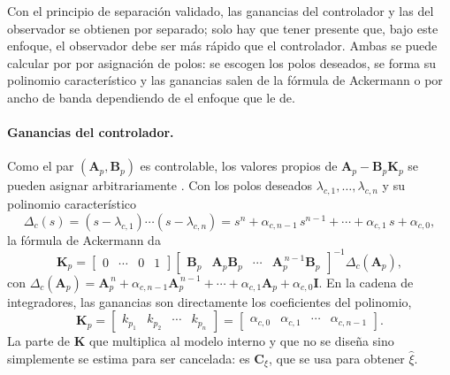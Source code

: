 Con el principio de separación validado, las ganancias del controlador y las del
observador se obtienen por separado; solo hay que tener presente que, bajo este
enfoque, el observador debe ser más rápido que el controlador. Ambas se puede calcular por 
por asignación de polos: se escogen los polos deseados, se forma su polinomio
característico y las ganancias salen de la fórmula de Ackermann o por ancho de banda dependiendo de el enfoque que le de.


\paragraph{Ganancias del controlador.} Como el par $(\mathbf{A}_p, \mathbf{B}_p)$
es controlable, los valores propios de $\mathbf{A}_p - \mathbf{B}_p\mathbf{K}_p$
se pueden asignar arbitrariamente \cite[teo.~8.3]{chen1999linear}. Con los polos
deseados $\lambda_{c,1}, \dots, \lambda_{c,n}$ y su polinomio característico
\begin{equation}
\Delta_c(s) = (s - \lambda_{c,1}) \cdots (s - \lambda_{c,n})
= s^{n} + \alpha_{c,n-1}\, s^{n-1} + \cdots + \alpha_{c,1}\, s + \alpha_{c,0},
\end{equation}
la fórmula de Ackermann da
\begin{equation}
\mathbf{K}_p =
\begin{bmatrix} 0 & \cdots & 0 & 1 \end{bmatrix}
\begin{bmatrix} \mathbf{B}_p & \mathbf{A}_p\mathbf{B}_p & \cdots & \mathbf{A}_p^{\,n-1}\mathbf{B}_p \end{bmatrix}^{-1}
\Delta_c(\mathbf{A}_p),
\label{eq:ackermann_K}
\end{equation}
con $\Delta_c(\mathbf{A}_p) = \mathbf{A}_p^{\,n} + \alpha_{c,n-1}\mathbf{A}_p^{\,n-1} + \cdots + \alpha_{c,1}\mathbf{A}_p + \alpha_{c,0}\mathbf{I}$.
En la cadena de integradores, las ganancias son directamente los coeficientes del
polinomio,
\begin{equation}
\mathbf{K}_p =
\begin{bmatrix} k_{p_1} & k_{p_2} & \cdots & k_{p_n} \end{bmatrix}
=
\begin{bmatrix} \alpha_{c,0} & \alpha_{c,1} & \cdots & \alpha_{c,n-1} \end{bmatrix} .
\end{equation}
La parte de $\mathbf{K}$ que multiplica al
modelo interno y que no se diseña sino simplemente se estima para ser cancelada: es $\mathbf{C}_{\xi}$, que se usa para obtener $\hat{\xi}$.

